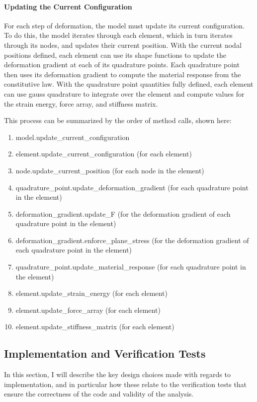 \documentclass[]{spie}  %
\begin{document}
\paragraph{Updating the Current Configuration}
For each step of deformation, the model must update its current configuration. To do this, the model iterates through each element, which in turn iterates through its nodes, and updates their current position. With the current nodal positions defined, each element can use its shape functions to update the deformation gradient at each of its quadrature points. Each quadrature point then uses its deformation gradient to compute the material response from the constitutive law. With the quadrature point quantities fully defined, each element can use gauss quadrature to integrate over the element and compute values for the strain energy, force array, and stiffness matrix. 

This process can be summarized by the order of method calls, shown here:
\begin{enumerate}
	\item model.update\_current\_configuration
	\item element.update\_current\_configuration (for each element)
	\item node.update\_current\_position (for each node in the element)
	\item quadrature\_point.update\_deformation\_gradient (for each quadrature point in the element)
	\item deformation\_gradient.update\_F (for the deformation gradient of each quadrature point in the element)
	\item deformation\_gradient.enforce\_plane\_stress (for the deformation gradient of each quadrature point in the element)
	\item quadrature\_point.update\_material\_response (for each quadrature point in the element)
	\item element.update\_strain\_energy (for each element)
	\item element.update\_force\_array (for each element)
	\item element.update\_stiffness\_matrix (for each element)
\end{enumerate}


\subsection{Implementation and Verification Tests}
In this section, I will describe the key design choices made with regards to implementation, and in particular how these relate to the verification tests that ensure the correctness of the code and validity of the analysis. 
\end{document}

